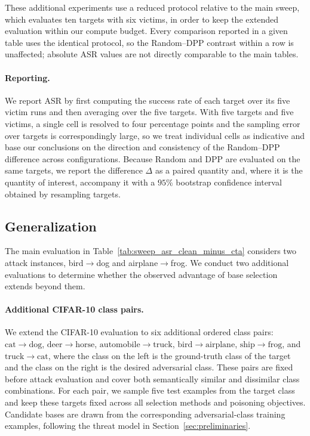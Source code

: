 These additional experiments use a reduced protocol relative to the main
sweep, which evaluates ten targets with six victims, in order to keep the
extended evaluation within our compute budget. Every comparison reported
in a given table uses the identical protocol, so the Random--DPP
contrast within a row is unaffected; absolute ASR values are not directly
comparable to the main tables.

\paragraph{Reporting.} We report ASR by first computing the success rate
of each target over its five victim runs and then averaging over the
five targets. With five targets and five victims, a single cell is
resolved to four percentage points and the sampling error over targets is
correspondingly large, so we treat individual cells as indicative and
base our conclusions on the direction and consistency of the
Random--DPP difference across configurations. Because Random and DPP are
evaluated on the same targets, we report the difference $\Delta$ as a
paired quantity and, where it is the quantity of interest, accompany it
with a $95\%$ bootstrap confidence interval obtained by resampling
targets.


\subsection{Generalization}
\label{sec:broader-generalization}

The main evaluation in Table~\ref{tab:sweep_asr_clean_minus_cta}
considers two attack instances, bird$\rightarrow$dog and
airplane$\rightarrow$frog. We conduct two additional evaluations to
determine whether the observed advantage of base selection extends
beyond them.

\paragraph{Additional CIFAR-10 class pairs.}
We extend the CIFAR-10 evaluation to six additional ordered class pairs:
$\mathrm{cat}\!\rightarrow\!\mathrm{dog}$,
$\mathrm{deer}\!\rightarrow\!\mathrm{horse}$,
$\mathrm{automobile}\!\rightarrow\!\mathrm{truck}$,
$\mathrm{bird}\!\rightarrow\!\mathrm{airplane}$,
$\mathrm{ship}\!\rightarrow\!\mathrm{frog}$, and
$\mathrm{truck}\!\rightarrow\!\mathrm{cat}$,
where the class on the left is the ground-truth class of the target and
the class on the right is the desired adversarial class. These pairs are
fixed before attack evaluation and cover both semantically similar and
dissimilar class combinations. For each pair, we sample five test
examples from the target class and keep these targets fixed across all
selection methods and poisoning objectives. Candidate bases are drawn
from the corresponding adversarial-class training examples, following
the threat model in Section~\ref{sec:preliminaries}.


